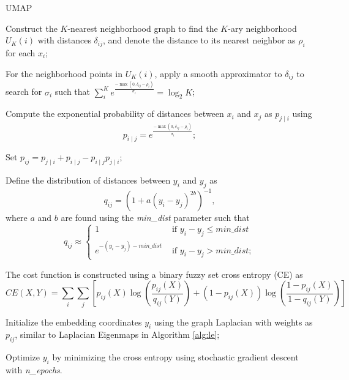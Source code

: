 \documentclass[11pt,a4paper,]{article}
\begin{document}
\begin{algorithm}[!htb]
  \caption{UMAP}
  \label{alg:umap}
  \DontPrintSemicolon
  \SetAlgoLined
  \BlankLine
  \begin{algorithmic}[1]

  \STATE Construct the $K$-nearest neighborhood graph to find the $K$-ary neighborhood $U_K(i)$ with distances $\delta_{ij}$, and denote the distance to its nearest neighbor as $\rho_i$ for each $x_i$;

  \STATE For the neighborhood points in $U_K(i)$, apply a smooth approximator to $\delta_{ij}$ to search for $\sigma_i$ such that $\sum_{i}^K e^{\frac{- \max(0, \delta_{ij} -\rho_{i}) } {\sigma_{i}}} = \log_2{K}$;

  \STATE Compute the exponential probability of distances between $x_i$ and $x_j$ as $p_{j \mid i}$ using
  $$
    p_{i \mid j}=e^{\frac{-\max(0, \delta_{ij} -\rho_{i})}{\sigma_{i}}};
  $$

  \STATE Set $p_{i j}=p_{j \mid i}+p_{i \mid j} - p_{i \mid j} p_{j \mid i}$;

  \STATE Define the distribution of distances between $y_i$ and $y_j$ as
  $$
    q_{i j}=\left(1+a\left(y_{i}-y_{j}\right)^{2 b}\right)^{-1},
  $$
  where $a$ and $b$ are found using the \textit{min\_dist} parameter such that
  $$
      q_{i j} \approx\left\{\begin{array}{ll}
  1 & \text { if } y_{i}-y_{j} \leq \textit{min\_dist} \\
  e^{-\left(y_{i}-y_{j}\right)-\textit{min\_dist}} & \text { if } y_{i}-y_{j} > \textit{min\_dist};
  \end{array}\right.
  $$

  \STATE The cost function is constructed using a binary fuzzy set cross entropy (CE) as
  $$
    CE(X, Y)=\sum_{i} \sum_{j}\left[p_{i j}(X) \log \left(\frac{p_{i j}(X)}{q_{i j}(Y)}\right)+\left(1-p_{i j}(X)\right) \log \left(\frac{1-p_{i j}(X)}{1-q_{i j}(Y)}\right)\right]
  $$

  \STATE Initialize the embedding coordinates $y_i$ using the graph Laplacian with weights as $p_{ij}$, similar to Laplacian Eigenmaps in Algorithm \ref{alg:le};

  \STATE Optimize $y_i$ by minimizing the cross entropy using stochastic gradient descent with \textit{n\_epochs}.

  \end{algorithmic}
\end{algorithm}
\end{document}
